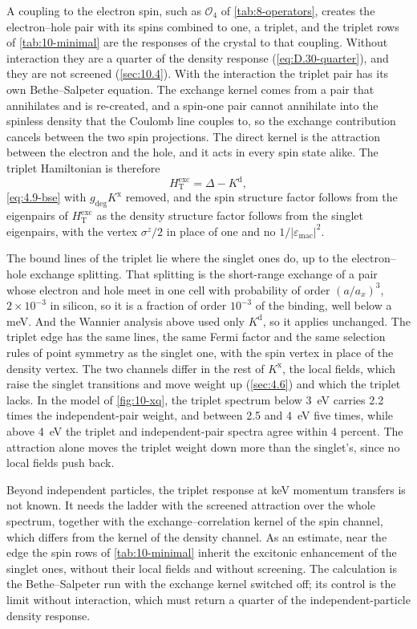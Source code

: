 A coupling to the electron spin, such as $\mathcal{O}_4$ of \cref{tab:8-operators}, creates the electron--hole pair with its spins combined to one, a triplet, and the triplet rows of \cref{tab:10-minimal} are the responses of the crystal to that coupling. Without interaction they are a quarter of the density response (\cref{eq:D.30-quarter}), and they are not screened (\cref{sec:10.4}). With the interaction the triplet pair has its own Bethe--Salpeter equation. The exchange kernel comes from a pair that annihilates and is re-created, and a spin-one pair cannot annihilate into the spinless density that the Coulomb line couples to, so the exchange contribution cancels between the two spin projections. The direct kernel is the attraction between the electron and the hole, and it acts in every spin state alike. The triplet Hamiltonian is therefore
\begin{equation}
  H^{\mathrm{exc}}_{\mathrm{T}} = \Delta - K^{\mathrm{d}} ,
  \label{eq:10.5-triplet}
\end{equation}
\cref{eq:4.9-bse} with $g_{\mathrm{deg}}K^{\mathrm{x}}$ removed, and the spin structure factor follows from the eigenpairs of $H^{\mathrm{exc}}_{\mathrm{T}}$ as the density structure factor follows from the singlet eigenpairs, with the vertex $\sigma^z/2$ in place of one and no $1/|\varepsilon_{\mathrm{mac}}|^2$.

The bound lines of the triplet lie where the singlet ones do, up to the electron--hole exchange splitting. That splitting is the short-range exchange of a pair whose electron and hole meet in one cell with probability of order $(a/a_x)^3$, $2\times10^{-3}$ in silicon, so it is a fraction of order $10^{-3}$ of the binding, well below a meV. And the Wannier analysis above used only $K^{\mathrm{d}}$, so it applies unchanged. The triplet edge has the same lines, the same Fermi factor and the same selection rules of point symmetry as the singlet one, with the spin vertex in place of the density vertex. The two channels differ in the rest of $K^{\mathrm{x}}$, the local fields, which raise the singlet transitions and move weight up (\cref{sec:4.6}) and which the triplet lacks. In the model of \cref{fig:10-xq}, the triplet spectrum below \SI{3}{eV} carries 2.2 times the independent-pair weight, and between 2.5 and \SI{4}{eV} five times, while above \SI{4}{eV} the triplet and independent-pair spectra agree within 4 percent. The attraction alone moves the triplet weight down more than the singlet's, since no local fields push back.

Beyond independent particles, the triplet response at keV momentum transfers is not known. It needs the ladder with the screened attraction over the whole spectrum, together with the exchange--correlation kernel of the spin channel, which differs from the kernel of the density channel. As an estimate, near the edge the spin rows of \cref{tab:10-minimal} inherit the excitonic enhancement of the singlet ones, without their local fields and without screening. The calculation is the Bethe--Salpeter run with the exchange kernel switched off; its control is the limit without interaction, which must return a quarter of the independent-particle density response.

